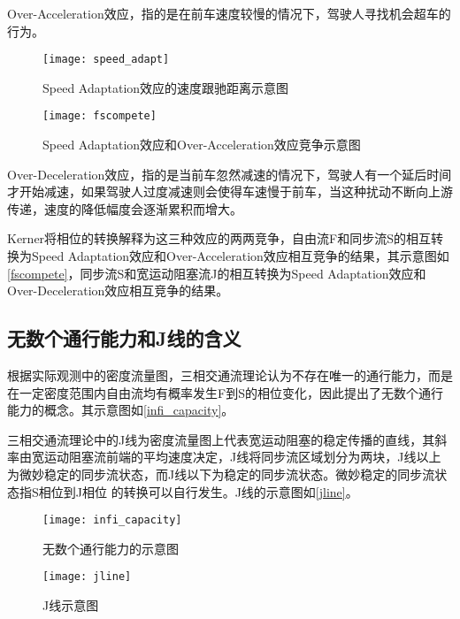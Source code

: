Over-Acceleration效应，指的是在前车速度较慢的情况下，驾驶人寻找机会超车的行为。

\begin{figure}[htbp]
\begin{minipage}[t]{0.48\linewidth}
\centering
\texttt{[image: speed\_adapt]}
\caption{Speed Adaptation效应的速度跟驰距离示意图\cite{S.Kerner2009}}
\label{speed_adapt}
\end{minipage}%
\hspace*{0.04\linewidth}
\begin{minipage}[t]{0.48\linewidth}
\centering
\texttt{[image: fscompete]}
\caption{Speed Adaptation效应和Over-Acceleration效应竞争示意图\cite{S.Kerner2009}}
\label{fscompete}
\end{minipage}
\end{figure}

Over-Deceleration效应，指的是当前车忽然减速的情况下，驾驶人有一个延后时间才开始减速，如果驾驶人过度减速则会使得车速慢于前车，当这种扰动不断向上游传递，速度的降低幅度会逐渐累积而增大。

Kerner将相位的转换解释为这三种效应的两两竞争，自由流F和同步流S的相互转换为Speed Adaptation效应和Over-Acceleration效应相互竞争的结果，其示意图如\autoref{fscompete}，同步流S和宽运动阻塞流J的相互转换为Speed Adaptation效应和Over-Deceleration效应相互竞争的结果。

\subsection{无数个通行能力和J线的含义}

根据实际观测中的密度流量图，三相交通流理论认为不存在唯一的通行能力，而是在一定密度范围内自由流均有概率发生F到S的相位变化，因此提出了无数个通行能力的概念。其示意图如\autoref{infi_capacity}。

三相交通流理论中的J线为密度流量图上代表宽运动阻塞的稳定传播的直线，其斜率由宽运动阻塞流前端的平均速度决定，J线将同步流区域划分为两块，J线以上为微妙稳定的同步流状态，而J线以下为稳定的同步流状态。微妙稳定的同步流状态指S相位到J相位 的转换可以自行发生。J线的示意图如\autoref{jline}。

\begin{figure}[htbp]
\begin{minipage}[t]{0.48\linewidth}
\centering
\texttt{[image: infi\_capacity]}
\caption{无数个通行能力的示意图\cite{S.Kerner2009}}
\label{infi_capacity}
\end{minipage}%
\hspace*{0.04\linewidth}
\begin{minipage}[t]{0.48\linewidth}
\centering
\texttt{[image: jline]}
\caption{J线示意图\cite{S.Kerner2009}}
\label{jline}
\end{minipage}
\end{figure}


